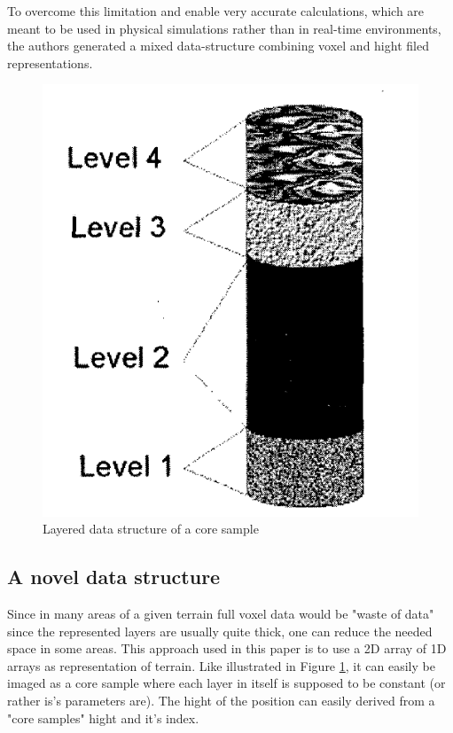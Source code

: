 To overcome this limitation and enable very accurate calculations, which are meant to be used in physical simulations rather than in real-time environments, the authors generated a mixed data-structure combining voxel and hight filed representations.

\begin{figure}[htb]
	\centering
	\includegraphics[width=\linewidth]{MGG_10/snap1.png}
	\caption{Layered data structure of a core sample}
	\label{fig:coresample}
\end{figure}

\subsection{A novel data structure}
Since in many areas of a given terrain full voxel data would be "waste  of data" \cite{marechal2010heat} since the represented layers are usually quite thick, one can reduce the needed space in some areas. This approach used in this paper is to use a 2D array of 1D arrays as representation of terrain. Like illustrated in Figure \ref{fig:coresample}, it can easily be imaged as a core sample where each layer in itself is supposed to be constant (or rather is's parameters are). The hight of the position can easily derived from a "core samples" hight and it's index.


